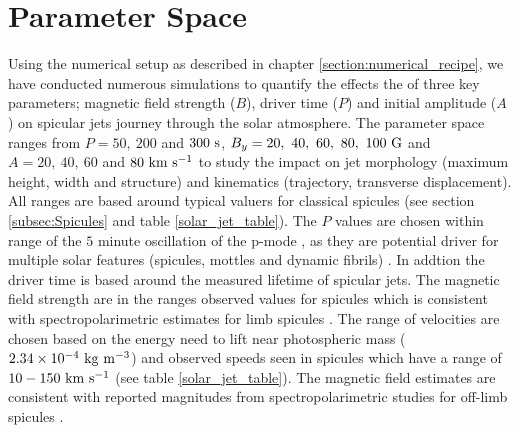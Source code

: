 \documentclass[12pt]{ociamthesis}
\newcommand{\kms}{~\rm{km ~s^{-1}}}
\newcommand{\np}{\\ \\}
\begin{document}
\section{Parameter Space}
\label{subsec:paramater_space}
Using the numerical setup as described in chapter \ref{section:numerical_recipe}, we have conducted numerous simulations to quantify the effects the of three key parameters; magnetic field strength ($B$), driver time ($P$) and initial amplitude ($A$) on spicular jets journey through the solar atmosphere. The parameter space ranges from $P=50,~200$ and $300~\rm{s}$, $B_y=20,~40,~60,~80,~100~\rm{G}$ and $A=20,~40,~60$ and $80 \kms$ to study the impact on jet morphology (maximum height, width and structure) and kinematics (trajectory, transverse displacement). All ranges are based around typical valuers for classical spicules (see section \ref{subsec:Spicules} and table \ref{solar_jet_table}). The $P$ values are chosen within range of the $5$ minute oscillation of the p-mode \citep{Leighton1962ApJ135474L}, as they are potential driver for multiple solar features (spicules, mottles  and dynamic fibrils) \citep{Pontieu2004Natur}. In addtion the driver time is based around the measured lifetime of spicular jets. The magnetic field strength are in the ranges observed values for spicules which is consistent with spectropolarimetric estimates for limb spicules \citep{centeno2010, suarez2015}. The range of velocities are chosen based on the energy need to lift near photospheric mass ($2.34\times10^{-4}~\rm{kg~m^{-3}}$) and observed speeds seen in spicules which have a range of $10-150\kms$ (see table \ref{solar_jet_table}). The magnetic field estimates are consistent with reported magnitudes from spectropolarimetric studies for off-limb spicules \citep{centeno2010, suarez2015}. \np
\end{document}
